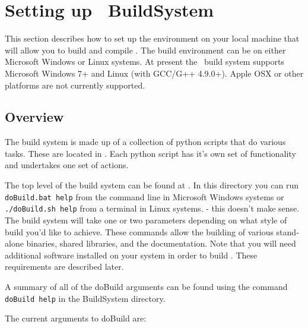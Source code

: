 \section{Setting up \CNAME\ BuildSystem\label{sec:build_environment}}

This section describes how to set up the environment on your local machine that will allow you to build and compile \CNAME. The build environment can be on either Microsoft Windows or Linux systems. At present the \CNAME\ build system supports Microsoft Windows 7+ and Linux (with GCC/G++ 4.9.0+). Apple OSX or other platforms are not currently supported.

\subsection{Overview}

The build system is made up of a collection of python scripts that do various tasks. These are located in . Each python script has it’s own set of functionality and undertakes one set of actions. 

The top level of the build system can be found at . In this directory you can run \texttt{doBuild.bat help} from the command line in Microsoft Windows systems or \texttt{./doBuild.sh help} from a terminal in Linux systems.
 - this doesn't make sense.
The build system will take one or two parameters depending on what style of build you'd like to achieve. These commands allow the building of various stand-alone binaries, shared libraries, and the documentation. Note that you will need additional software installed on your system in order to build \CNAME . These requirements are described later.

A summary of all of the doBuild arguments can be found using the command \texttt{doBuild help} in the BuildSystem directory.

The current arguments to doBuild are: 

